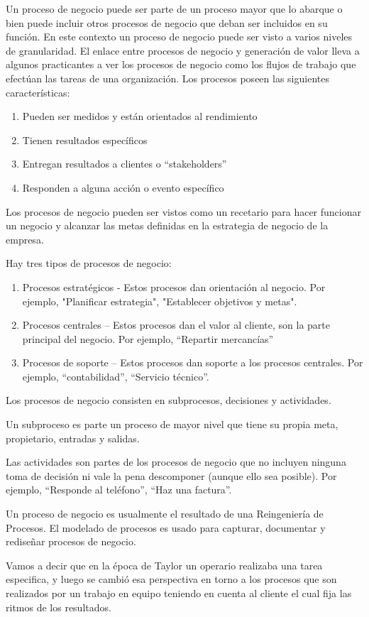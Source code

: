 Un proceso de negocio puede ser parte de un proceso mayor que lo abarque o bien puede incluir otros
procesos de negocio que deban ser incluidos en su función. En este contexto un proceso de negocio
puede ser visto a varios niveles de granularidad. El enlace entre procesos de negocio y generación
de valor lleva a algunos practicantes a ver los procesos de negocio como los flujos de trabajo que
efectúan las tareas de una organización. Los procesos poseen las siguientes características:
\begin{enumerate}
	\item Pueden ser medidos y están orientados al rendimiento
	\item Tienen resultados específicos
	\item Entregan resultados a clientes o “stakeholders”
	\item Responden a alguna acción o evento específico
\end{enumerate}
Los procesos de negocio pueden ser vistos como un recetario para hacer funcionar un negocio y alcanzar
las metas definidas en la estrategia de negocio de la empresa.

Hay tres tipos de procesos de negocio:
\begin{enumerate}
	\item Procesos estratégicos - Estos procesos dan orientación al negocio. Por ejemplo, "Planificar estrategia", "Establecer objetivos y metas".
	\item Procesos centrales – Estos procesos dan el valor al cliente, son la parte principal del negocio. Por ejemplo, “Repartir mercancías”
	\item Procesos de soporte – Estos procesos dan soporte a los procesos centrales. Por ejemplo, “contabilidad”, “Servicio técnico”.
\end{enumerate}
Los procesos de negocio consisten en subprocesos, decisiones y actividades.

Un subproceso es parte un proceso de mayor nivel que tiene su propia meta, propietario, entradas y salidas.

Las actividades son partes de los procesos de negocio que no incluyen ninguna toma de decisión ni vale
la pena descomponer (aunque ello sea posible). Por ejemplo, “Responde al teléfono”, “Haz una factura”.

Un proceso de negocio es usualmente el resultado de una Reingeniería de Procesos. El modelado de procesos
es usado para capturar, documentar y rediseñar procesos de negocio.

Vamos a decir que en la época de Taylor un operario realizaba una tarea especifica, y luego se cambió esa
perspectiva en torno a los procesos que son realizados por un trabajo en equipo teniendo en cuenta al cliente
el cual fija las ritmos de los resultados.

